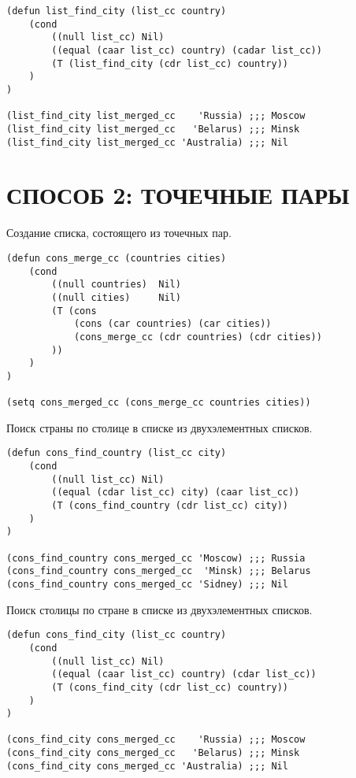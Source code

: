 \begin{lstlisting}
(defun list_find_city (list_cc country)
    (cond
        ((null list_cc) Nil)
        ((equal (caar list_cc) country) (cadar list_cc))
        (T (list_find_city (cdr list_cc) country))
    )
)

(list_find_city list_merged_cc    'Russia) ;;; Moscow
(list_find_city list_merged_cc   'Belarus) ;;; Minsk
(list_find_city list_merged_cc 'Australia) ;;; Nil
\end{lstlisting}

\section{СПОСОБ 2: ТОЧЕЧНЫЕ ПАРЫ}

Создание списка, состоящего из точечных пар.

\begin{lstlisting}
(defun cons_merge_cc (countries cities)
    (cond
        ((null countries)  Nil)
        ((null cities)     Nil)
        (T (cons
            (cons (car countries) (car cities))
            (cons_merge_cc (cdr countries) (cdr cities))
        ))
    )
)

(setq cons_merged_cc (cons_merge_cc countries cities))
\end{lstlisting}

Поиск страны по столице в списке из двухэлементных списков.

\begin{lstlisting}
(defun cons_find_country (list_cc city)
    (cond
        ((null list_cc) Nil)
        ((equal (cdar list_cc) city) (caar list_cc))
        (T (cons_find_country (cdr list_cc) city))
    )
)

(cons_find_country cons_merged_cc 'Moscow) ;;; Russia
(cons_find_country cons_merged_cc  'Minsk) ;;; Belarus
(cons_find_country cons_merged_cc 'Sidney) ;;; Nil
\end{lstlisting}

Поиск столицы по стране в списке из двухэлементных списков.

\begin{lstlisting}
(defun cons_find_city (list_cc country)
    (cond
        ((null list_cc) Nil)
        ((equal (caar list_cc) country) (cdar list_cc))
        (T (cons_find_city (cdr list_cc) country))
    )
)

(cons_find_city cons_merged_cc    'Russia) ;;; Moscow
(cons_find_city cons_merged_cc   'Belarus) ;;; Minsk
(cons_find_city cons_merged_cc 'Australia) ;;; Nil
\end{lstlisting}

